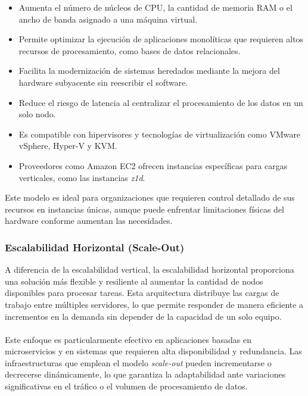 {                \begin{itemize}
                    \item Aumenta el número de núcleos de CPU, la cantidad de memoria RAM o el ancho de banda asignado a una máquina virtual.
                    \item Permite optimizar la ejecución de aplicaciones monolíticas que requieren altos recursos de procesamiento, como bases de datos relacionales.
                    \item Facilita la modernización de sistemas heredados mediante la mejora del hardware subyacente sin reescribir el software.
                    \item Reduce el riesgo de latencia al centralizar el procesamiento de los datos en un solo nodo.
                    \item Es compatible con hipervisores y tecnologías de virtualización como VMware vSphere, Hyper-V y KVM.
                    \item Proveedores como Amazon EC2 ofrecen instancias específicas para cargas verticales, como las instancias \textit{z1d}.
                \end{itemize}
                
                Este modelo es ideal para organizaciones que requieren control detallado de sus recursos en instancias únicas, aunque puede enfrentar limitaciones físicas del hardware conforme aumentan las necesidades.
                
            \subsubsection{Escalabilidad Horizontal (Scale-Out)}
                A diferencia de la escalabilidad vertical, la escalabilidad horizontal proporciona una solución más flexible y resiliente al aumentar la cantidad de nodos disponibles para procesar tareas. Esta arquitectura distribuye las cargas de trabajo entre múltiples servidores, lo que permite responder de manera eficiente a incrementos en la demanda sin depender de la capacidad de un solo equipo.

                \paragraph{}Este enfoque es particularmente efectivo en aplicaciones basadas en microservicios y en sistemas que requieren alta disponibilidad y redundancia. Las infraestructuras que emplean el modelo \textit{scale-out} pueden incrementarse o decrecerse dinámicamente, lo que garantiza la adaptabilidad ante variaciones significativas en el tráfico o el volumen de procesamiento de datos.
                
}
